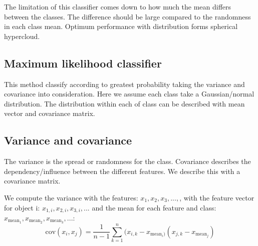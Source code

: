The limitation of this classifier comes down to how much the mean differs between the classes. The difference should be large compared to the randomness in each class mean. Optimum performance with distribution forms spherical hypercloud.




\subsection*{Maximum likelihood classifier}
This method classify according to greatest probability taking the variance and covariance into consideration. Here we assume each class take a Gaussian/normal distribution. The distribution within each of class can be described with mean vector and covariance matrix. 




\subsection*{Variance and covariance}
The variance is the spread or randomness for the class. Covariance describes the dependency/influence between the different features. We describe this with a covariance matrix. 

We compute the variance with the features: $x_1,x_2,x_3,..., $, with the feature vector for object i: $x_{1,i},x_{2,i},x_{3,i},...$ and the mean for each feature and class: $x_{\text{mean}_1},x_{\text{mean}_2},x_{\text{mean}_3},...$:
\begin{equation}
\text{cov}(x_i,x_j) = \frac{1} {n-1} \sum_{k=1}^{n} (x_{i,k}-x_{\text{mean}_i)}(x_{j,k}-x_{\text{mean}_j})
\end{equation}





